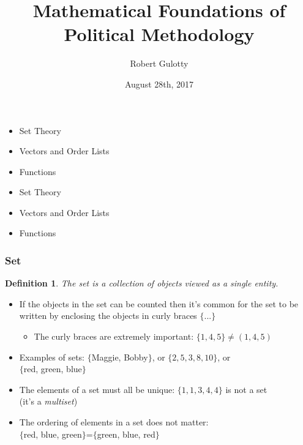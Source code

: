 \documentclass{beamer}
\title[PLSC 43401] %
{Mathematical Foundations of Political Methodology}
\author{Robert Gulotty}
\institute[University of Chicago]{Associate Professor\\Department of Political Science \\  University of Chicago}
\date{August 28th, 2017}
\newtheorem{defn}{Definition}
\numberwithin{equation}{section}
\begin{document}
\begin{frame}
\titlepage
\end{frame}




\begin{frame}

\begin{itemize}
\item \textcolor{myblack}{Set Theory}
\item \textcolor{myblack}{Vectors and Order Lists}
\item \textcolor{myblack}{Functions}
\end{itemize}

\end{frame}



\begin{frame}

\begin{itemize}
\item \textcolor{myblack}{Set Theory}
\item \textcolor{mygray}{Vectors and Order Lists}
\item \textcolor{mygray}{Functions}
\end{itemize}

\end{frame}



\begin{frame}
\frametitle{Set}

\begin{defn}
The set is a collection of objects viewed as a single entity.
\end{defn}
\pause

\begin{itemize}
\item If the objects in the set can be counted then it's common for the set to be written by enclosing the objects in curly braces $\{...\}$ \pause
 
\begin{itemize}
\item The curly braces are extremely important: $\{1, 4, 5\}\not=(1, 4, 5)$ \pause
\end{itemize}
 
\item Examples of sets: $\{$Maggie, Bobby$\}$, or $\{2, 5, 3, 8, 10\}$, or \\$\{$red, green, blue$\}$ \pause
 
\item The elements of a set must all be unique: $\{1, 1, 3, 4, 4\}$ is not a set \\(it's a \textit{multiset}) \pause

\item The ordering of elements in a set does not matter: \\$\{$red, blue, green$\}$=$\{$green, blue, red$\}$

\end{itemize}
\end{frame}
\end{document}
